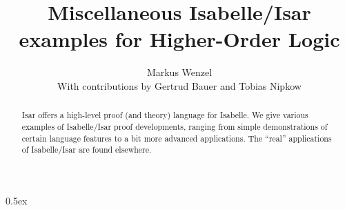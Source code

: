 




\title{Miscellaneous Isabelle/Isar examples for Higher-Order Logic}
\author{Markus Wenzel \\[2ex]
  With contributions by Gertrud Bauer and Tobias Nipkow}
\maketitle

\begin{abstract}
  Isar offers a high-level proof (and theory) language for Isabelle.
  We give various examples of Isabelle/Isar proof developments,
  ranging from simple demonstrations of certain language features to a
  bit more advanced applications.  The ``real'' applications of
  Isabelle/Isar are found elsewhere.
\end{abstract}

\tableofcontents

\parindent 0pt \parskip 0.5ex



\nocite{isabelle-isar-ref,Wenzel:1999:TPHOL}





